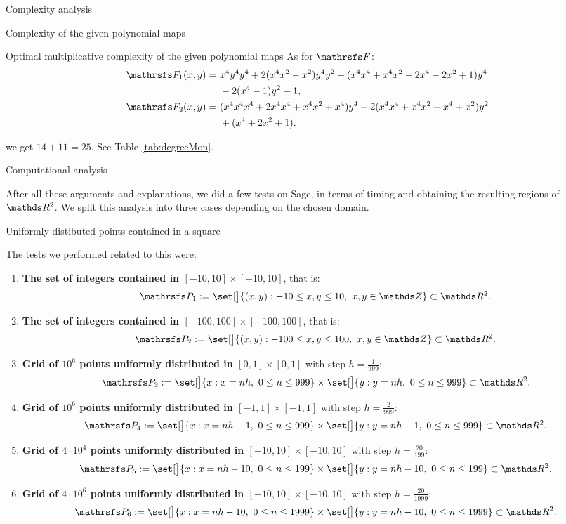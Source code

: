 \documentclass[11pt, a4paper, english, twoside, notitlepage, openright]{report}
\begin{document}
\begin{chapter}{Complexity analysis}
\begin{section}{Complexity of the given polynomial maps}
\begin{subsection}{Optimal multiplicative complexity of the given polynomial maps}
As for $\FFF$: 
\begin{align*}
\FFF_1(x,y) = &\  x^{4} y^{4}y^4 + 2   {(x^{4}x^2 - x^{2})} y^{4}y^2 + (x^{4}x^4 + x^{4}x^2 - 2   x^{4} - 2   x^{2} + 1) y^{4}\\
&\  - 2   {(x^{4} - 1)} y^{2} + 1, \\
\FFF_2(x,y) =&\ {(x^{4}x^4x^4 + 2   x^{4}x^4 + x^{4}x^2 + x^{4})} y^{4}  - 2   {(x^{4}x^4 + x^{4}x^2 + x^{4} + x^{2})} y^{2} \\
&\ + (x^{4}+ 2   x^{2} + 1).
\end{align*}

we get $14+11=25$. See Table \ref{tab:degreeMon}.

\end{subsection}

\end{section}

\begin{section}{Computational analysis}\label{5sect3}

After all these arguments and explanations, we did a few tests on Sage, in terms of timing and obtaining the resulting regions of $\R^2$. We split this analysis into three cases depending on the chosen domain.

\begin{subsection}{Uniformly distibuted points contained in a square}

The tests we performed related to this were:
\begin{enumerate}[1. ]
\item \textbf{The set of integers contained in $[-10, 10]\times[-10,10]$}, that is:
$$
\PP_1 := \set[\big]{(x,y): -10\le x,y\le 10,\ x, y\in \Z} \subset \R^2.
$$
\item \textbf{The set of integers contained in $[-100, 100]\times[-100,100]$}, that is:
$$
\PP_2 := \set[\big]{(x,y): -100\le x,y\le 100,\ x, y\in \Z} \subset \R^2.
$$
\item \textbf{Grid of $10^6$ points uniformly distributed in $[0, 1]\times[0,1]$} with step $h=\tfrac{1}{999}$:
$$
\PP_3 := \set[\big]{x: x = nh,\ 0\le n\le 999 } \times \set[\big]{y: y=nh,\ 0\le n\le 999 } \subset \R^2.
$$
\item \textbf{Grid of $10^6$ points uniformly distributed in $[-1, 1]\times[-1,1]$} with step $h=\tfrac{2}{999}$:
$$
\PP_4 := \set[\big]{x: x = nh -1,\ 0\le n\le 999 } \times \set[\big]{y: y=nh-1,\ 0\le n\le 999 } \subset \R^2.
$$
\item \textbf{Grid of $4\cdot 10^4$ points uniformly distributed in $[-10, 10]\times[-10,10]$} with step $h=\tfrac{20}{199}$:
$$
\PP_5 := \set[\big]{x: x = nh -10,\ 0\le n\le 199 } \times \set[\big]{y: y=nh-10,\ 0\le n\le 199 } \subset \R^2.
$$
\item \textbf{Grid of $4\cdot 10^6$ points uniformly distributed in $[-10, 10]\times[-10,10]$} with step $h=\tfrac{20}{1999}$:
$$
\PP_6 := \set[\big]{x: x = nh -10,\ 0\le n\le 1999 } \times \set[\big]{y: y=nh-10,\ 0\le n\le 1999 } \subset \R^2.
$$
\end{enumerate}


\end{subsection}
\end{section}
\end{chapter}
\end{document}
